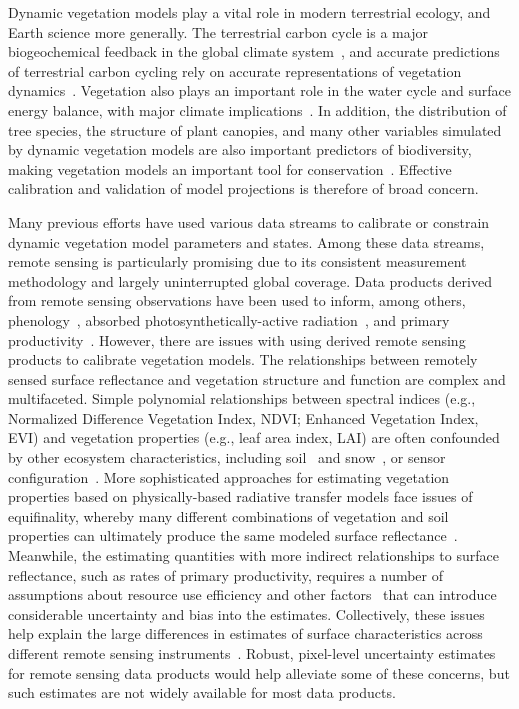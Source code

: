 \introduction  %

Dynamic vegetation models play a vital role in modern terrestrial ecology, and Earth science more generally.
The terrestrial carbon cycle is a major biogeochemical feedback in the global climate system~\citep{heinze_2019_esd_reviews}, and accurate predictions of terrestrial carbon cycling rely on accurate representations of vegetation dynamics~\citep{pacala_1995_details_that_matter}.
Vegetation also plays an important role in the water cycle and surface energy balance, with major climate implications~\citep{bonan2008forests}.
In addition, the distribution of tree species, the structure of plant canopies, and many other variables simulated by dynamic vegetation models are also important predictors of biodiversity, making vegetation models an important tool for conservation~\citep{mcmahon2011improving}.
Effective calibration and validation of model projections is therefore of broad concern.

Many previous efforts have used various data streams to calibrate or constrain dynamic vegetation model parameters and states.
Among these data streams, remote sensing is particularly promising due to its consistent measurement methodology and largely uninterrupted global coverage.
Data products derived from remote sensing observations have been used to inform, among others,
phenology~\citep{knorr2010carbon, viskari2015modeldata},
absorbed photosynthetically-active radiation~\citep{peylin2016new, schurmann2016constraining},
and primary productivity~\citep{macbean2018strong}.
However, there are issues with using derived remote sensing products to calibrate vegetation models.
The relationships between remotely sensed surface reflectance and vegetation structure and function are complex and multifaceted.
Simple polynomial relationships between spectral indices (e.g., Normalized Difference Vegetation Index, NDVI; Enhanced Vegetation Index, EVI) and vegetation properties (e.g., leaf area index, LAI) are often confounded by other ecosystem characteristics, including soil~\citep{myneni1994relationship} and snow~\citep{zhang2020evaluating}, or sensor configuration~\citep{fensholt2004evaluation}.
More sophisticated approaches for estimating vegetation properties based on physically-based radiative transfer models face issues of equifinality, whereby many different combinations of vegetation and soil properties can ultimately produce the same modeled surface reflectance~\citep{combal2003retrieval, lewis2007spectral}.
Meanwhile, the estimating quantities with more indirect relationships to surface reflectance, such as rates of primary productivity, requires a number of assumptions about resource use efficiency and other factors~\citep{running2004continuous} that can introduce considerable uncertainty and bias into the estimates.
Collectively, these issues help explain the large differences in estimates of surface characteristics across different remote sensing instruments~\citep{liu_2018_satellite}.
Robust, pixel-level uncertainty estimates for remote sensing data products would help alleviate some of these concerns, but such estimates are not widely available for most data products.


